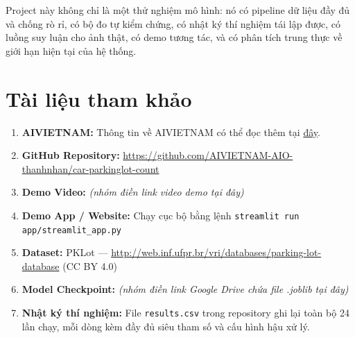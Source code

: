 \documentclass[12pt]{ai_conquer2026}
\begin{document}
Project này không chỉ là một thử nghiệm mô hình: nó có pipeline dữ liệu đầy đủ và chống rò rỉ, có bộ đo tự kiểm chứng, có nhật ký thí nghiệm tái lập được, có luồng suy luận cho ảnh thật, có demo tương tác, và có phân tích trung thực về giới hạn hiện tại của hệ thống.

\newpage
\section{Tài liệu tham khảo}
\label{section:references}
\nocite{*}
\vspace{-3.2em}
\printbibliography

\newpage
\begin{appendices}
\begin{enumerate}
\item \textbf{AIVIETNAM:} Thông tin về AIVIETNAM có thể đọc thêm tại \href{https://aivietnam.edu.vn/}{đây}.
\item \textbf{GitHub Repository:} \url{https://github.com/AIVIETNAM-AIO-thanhnhan/car-parkinglot-count}
\item \textbf{Demo Video:} \textit{(nhóm điền link video demo tại đây)}
\item \textbf{Demo App / Website:} Chạy cục bộ bằng lệnh \texttt{streamlit run app/streamlit\_app.py}
\item \textbf{Dataset:} PKLot --- \url{http://web.inf.ufpr.br/vri/databases/parking-lot-database} (CC BY 4.0)
\item \textbf{Model Checkpoint:} \textit{(nhóm điền link Google Drive chứa file .joblib tại đây)}
\item \textbf{Nhật ký thí nghiệm:} File \texttt{results.csv} trong repository ghi lại toàn bộ 24 lần chạy, mỗi dòng kèm đầy đủ siêu tham số và cấu hình hậu xử lý.
\end{enumerate}
\end{appendices}
\end{document}
